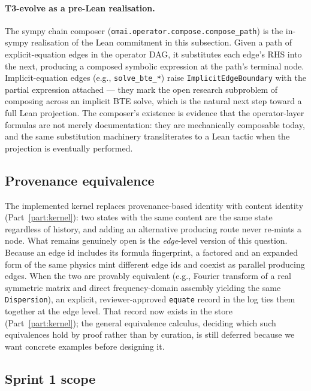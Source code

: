\documentclass[11pt,a4paper]{article}
\begin{document}
\paragraph{T3-evolve as a pre-Lean realisation.} The sympy chain composer
(\texttt{omai.operator.compose.compose\_path}) is the in-sympy realisation of the
Lean commitment in this subsection. Given a path of explicit-equation edges in the
operator DAG, it substitutes each edge's RHS into the next, producing a composed
symbolic expression at the path's terminal node. Implicit-equation edges (e.g.,
\texttt{solve\_bte\_*}) raise \texttt{ImplicitEdgeBoundary} with the partial
expression attached --- they mark the open research subproblem of composing across
an implicit BTE solve, which is the natural next step toward a full Lean
projection. The composer's existence is evidence that the operator-layer formulas
are not merely documentation: they are mechanically composable today, and the same
substitution machinery transliterates to a Lean tactic when the projection is
eventually performed.

\subsection{Provenance equivalence}

The implemented kernel replaces provenance-based identity with content identity
(Part~\ref{part:kernel}): two states with the same content are the same state
regardless of history, and adding an alternative producing route never re-mints a
node. What remains genuinely open is the \emph{edge}-level version of this
question. Because an edge id includes its formula fingerprint, a factored and an
expanded form of the same physics mint different edge ids and coexist as parallel
producing edges. When the two are provably equivalent (e.g., Fourier transform of
a real symmetric matrix and direct frequency-domain assembly yielding the same
\texttt{Dispersion}), an explicit, reviewer-approved \texttt{equate} record in the
log ties them together at the edge level. That record now exists in the store
(Part~\ref{part:kernel}); the general equivalence calculus, deciding which such
equivalences hold by proof rather than by curation, is still deferred because we
want concrete examples before designing it.

\subsection{Sprint 1 scope}
\end{document}
